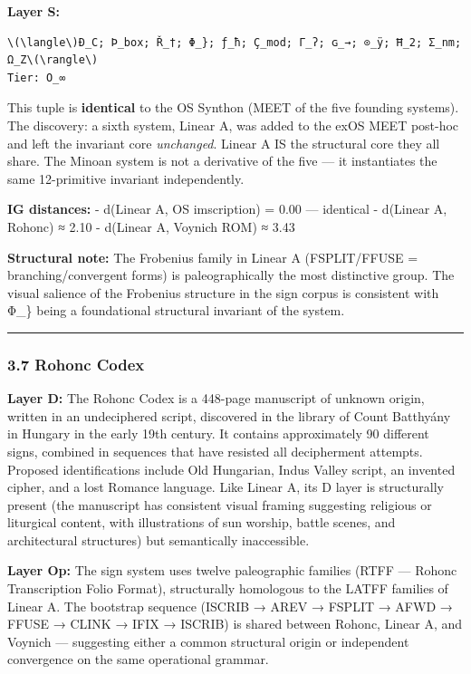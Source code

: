 \textbf{Layer S:}

\begin{verbatim}
\(\langle\)Ð_C; Þ_box; Ř_†; Φ_}; ƒ_ħ; Ç_mod; Γ_ʔ; ɢ_→; ⊙_ÿ; Ħ_2; Σ_nm; Ω_Z\(\rangle\)
Tier: O_∞
\end{verbatim}

This tuple is \textbf{identical} to the OS Synthon (MEET of the five
founding systems). The discovery: a sixth system, Linear A, was added to
the exOS MEET post-hoc and left the invariant core \emph{unchanged}.
Linear A IS the structural core they all share. The Minoan system is not
a derivative of the five --- it instantiates the same 12-primitive
invariant independently.

\textbf{IG distances:} - d(Linear A, OS imscription) = 0.00 ---
identical - d(Linear A, Rohonc) ≈ 2.10 - d(Linear A, Voynich ROM) ≈ 3.43

\textbf{Structural note:} The Frobenius family in Linear A (FSPLIT/FFUSE
= branching/convergent forms) is paleographically the most distinctive
group. The visual salience of the Frobenius structure in the sign corpus
is consistent with Φ\_\} being a foundational structural invariant of
the system.

\begin{center}\rule{0.5\linewidth}{0.5pt}\end{center}

\subsubsection{3.7 Rohonc Codex}\label{rohonc-codex}

\textbf{Layer D:} The Rohonc Codex is a 448-page manuscript of unknown
origin, written in an undeciphered script, discovered in the library of
Count Batthyány in Hungary in the early 19th century. It contains
approximately 90 different signs, combined in sequences that have
resisted all decipherment attempts. Proposed identifications include Old
Hungarian, Indus Valley script, an invented cipher, and a lost Romance
language. Like Linear A, its D layer is structurally present (the
manuscript has consistent visual framing suggesting religious or
liturgical content, with illustrations of sun worship, battle scenes,
and architectural structures) but semantically inaccessible.

\textbf{Layer Op:} The sign system uses twelve paleographic families
(RTFF --- Rohonc Transcription Folio Format), structurally homologous to
the LATFF families of Linear A. The bootstrap sequence (ISCRIB → AREV →
FSPLIT → AFWD → FFUSE → CLINK → IFIX → ISCRIB) is shared between Rohonc,
Linear A, and Voynich --- suggesting either a common structural origin
or independent convergence on the same operational grammar.

